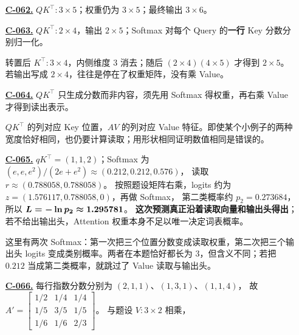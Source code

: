 \begin{enumerate}[label={},leftmargin=4.8em,itemsep=4pt]
\item[\textbf{\hyperref[exercise:attention-shapes]{C-062.}}] \leavevmode{}\label{solution:C-062}\label{solution:attention-shapes}$QK^\top:3\times5$；权重仍为 $3\times5$；最终输出 $3\times6$。
\item[\textbf{\hyperref[exercise:cross-attention-shapes]{C-063.}}] \leavevmode{}\label{solution:C-063}\label{solution:cross-attention-shapes}$QK^\top:2\times4$，输出 $2\times5$；Softmax 对每个 Query 的\textbf{一行} Key 分数分别归一化。\par 转置后 $K^\top:3\times4$，内侧维度 $3$ 消去；随后 $(2\times4)(4\times5)$ 才得到 $2\times5$。若输出写成 $2\times4$，往往是停在了权重矩阵，没有乘 Value。
\item[\textbf{\hyperref[exercise:score-value-confusion]{C-064.}}] \leavevmode{}\label{solution:C-064}\label{solution:score-value-confusion}$QK^\top$ 只生成分数而非内容，须先用 Softmax 得权重，再右乘 Value 才得到读出表示。\par$QK^\top$ 的列对应 Key 位置，$AV$ 的列对应 Value 特征。即使某个小例子的两种宽度恰好相同，也仍要计算读取；用形状相同证明数值相同是错误的。
\item[\textbf{\hyperref[exercise:attention-loss-transfer]{C-065.}}] \leavevmode{}\label{solution:C-065}\label{solution:attention-loss-transfer}$qK^\top=(1,1,2)$；Softmax 为
$(e,e,e^2)/(2e+e^2)\approx(0.212,0.212,0.576)$，
读取 $r\approx(0.788058,0.788058)$。
按照题设矩阵右乘，logits 约为
$z=(1.576117,0.788058,0)$，再做 Softmax，
第二类概率约 $p_2=0.273684$，所以
$\boldsymbol{L=-\ln p_2\approx1.295781}$。
\textbf{这次预测真正沿着读取向量和输出头得出}；
若不给出输出头，Attention 权重本身不足以唯一决定词表概率。\par 这里有两次 Softmax：第一次把三个位置分数变成读取权重，第二次把三个输出头 logits 变成类别概率。两者在本题恰好都长为 $3$，但含义不同；若把 $0.212$ 当成第二类概率，就跳过了 Value 读取与输出头。
\item[\textbf{\hyperref[exercise:batch-softmax-recompute]{C-066.}}] \leavevmode{}\label{solution:C-066}\label{solution:batch-softmax-recompute}每行指数分数分别为 $(2,1,1)$、$(1,3,1)$、$(1,1,4)$，
故 $A'=\boxed{\begin{bmatrix}
1/2&1/4&1/4\\
1/5&3/5&1/5\\
1/6&1/6&2/3
\end{bmatrix}}$。
与题设 $V:3\times2$ 相乘，

\end{enumerate}
